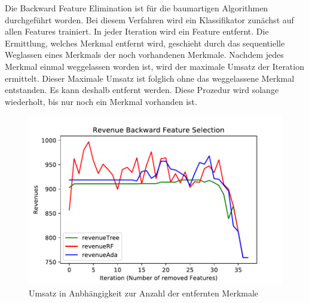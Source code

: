 Die Backward Feature Elimination ist für die baumartigen Algorithmen durchgeführt worden. Bei diesem Verfahren wird ein Klassifikator zunächst auf allen Features trainiert. In jeder Iteration wird ein Feature entfernt. Die Ermittlung, welches Merkmal entfernt wird, geschieht durch das sequentielle Weglassen eines Merkmals der noch vorhandenen Merkmale. Nachdem jedes Merkmal einmal weggelassen worden ist, wird der maximale Umsatz der Iteration ermittelt. Dieser Maximale Umsatz ist folglich ohne das weggelassene Merkmal entstanden. Es kann deshalb entfernt werden. Diese Prozedur wird solange wiederholt, bis nur noch ein Merkmal vorhanden ist.\\

\FloatBarrier
\begin{figure}[!htbp]
\begin{center}
\includegraphics[scale=0.8]{pdf/backward2.pdf}
\end{center}
\caption{Umsatz in Anbhängigkeit zur Anzahl der entfernten Merkmale}
\label{fig:backward2}
\end{figure}
\FloatBarrier

